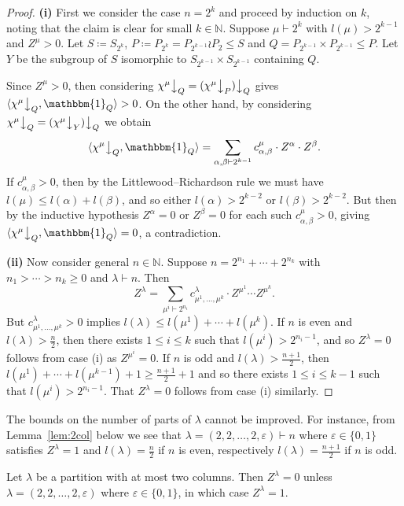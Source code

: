 \documentclass[ALCO, Unicode]{cedram}
\newcommand{\triv}{\mathbbm{1}}
\newcommand{\down}{\big\downarrow}
\newcommand{\N}{\mathbb{N}}
\begin{document}
\begin{proof}
	\textbf{(i)} First we consider the case $n=2^k$ and proceed by induction on $k$, noting that the claim is clear for small $k\in\N$. Suppose $\mu\vdash 2^k$ with $l(\mu)>2^{k-1}$ and $Z^\mu>0$. Let $S\coloneqq S_{2^k}$, $P\coloneqq P_{2^k}=P_{2^{k-1}}\wr P_2\le S$ and $Q=P_{2^{k-1}}\times P_{2^{k-1}}\le P$. Let $Y$ be the subgroup of $S$ isomorphic to $S_{2^{k-1}}\times S_{2^{k-1}}$ containing $Q$.
	
	Since $Z^\mu>0$, then considering $\chi^\mu\down_Q = (\chi^\mu\down_P)\down_Q$ gives $\langle \chi^\mu\down_Q,\triv_Q\rangle >0$. On the other hand, by considering $\chi^\mu\down_Q = (\chi^\mu\down_Y)\down_Q$ we obtain
	\[ \langle \chi^\mu\down_Q,\triv_Q\rangle = \sum_{\alpha,\beta\vdash 2^{k-1}} c^\mu_{\alpha,\beta}\cdot Z^\alpha\cdot Z^\beta. \]
	If $c^\mu_{\alpha,\beta}>0$, then by the Littlewood--Richardson rule we must have $l(\mu)\le l(\alpha)+l(\beta)$, and so either $l(\alpha)>2^{k-2}$ or $l(\beta)>2^{k-2}$. But then by the inductive hypothesis $Z^\alpha=0$ or $Z^\beta=0$ for each such $c^\mu_{\alpha,\beta}>0$, giving $\langle \chi^\mu\down_Q,\triv_Q\rangle=0$, a contradiction.
	
	\noindent\textbf{(ii)} Now consider general $n\in\N$. Suppose $n=2^{n_1}+\cdots+2^{n_k}$ with $n_1>\cdots>n_k\ge 0$ and $\lambda\vdash n$. Then 
	\[  Z^\lambda = \sum_{\mu^i\vdash 2^{n_i}} c^\lambda_{\mu^1,\dotsc,\mu^k}\cdot Z^{\mu^1}\cdots Z^{\mu^k}. \]
	But $c^\lambda_{\mu^1,\dotsc,\mu^k}>0$ implies $l(\lambda)\le l(\mu^1)+\cdots+l(\mu^k)$. If $n$ is even and $l(\lambda)>\frac{n}{2}$, then there exists $1\le i\le k$ such that $l(\mu^i)>2^{n_i-1}$, and so $Z^\lambda=0$ follows from case (i) as $Z^{\mu^i}=0$. If $n$ is odd and $l(\lambda)>\frac{n+1}{2}$, then $l(\mu^1)+\cdots+l(\mu^{k-1})+1\ge \frac{n+1}{2}+1$ and so there exists $1\le i\le k-1$ such that $l(\mu^i)>2^{n_i-1}$. That $Z^\lambda=0$ follows from case (i) similarly.
\end{proof}

\begin{remark}
	The bounds on the number of parts of $\lambda$ cannot be improved. For instance, from Lemma~\ref{lem:2col} below we see that $\lambda=(2,2,\dotsc,2,\varepsilon)\vdash n$ where $\varepsilon\in\{0,1\}$ satisfies $Z^\lambda=1$ and $l(\lambda)=\frac{n}{2}$ if $n$ is even, respectively $l(\lambda)=\frac{n+1}{2}$ if $n$ is odd.%
\end{remark}

\begin{lemma}\label{lem:2col}
	Let $\lambda$ be a partition with at most two columns. Then $Z^\lambda=0$ unless $\lambda=(2,2,\dotsc,2,\varepsilon)$ where $\varepsilon\in\{0,1\}$, in which case $Z^\lambda=1$.
\end{lemma}
\end{document}
